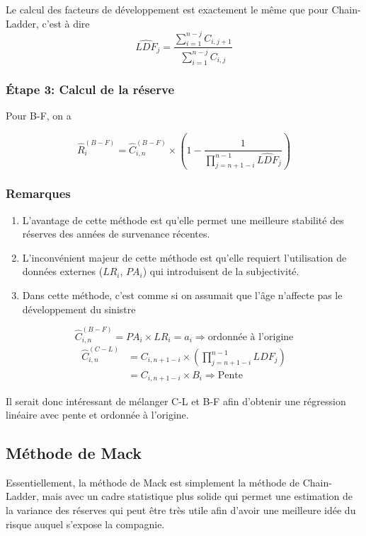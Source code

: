 \documentclass[11pt,french]{report}
\begin{document}
Le calcul des facteurs de développement est exactement le même que pour Chain-Ladder, c'est à dire
$$\widehat{LDF}_j=\frac{\sum_{i=1}^{n-j} C_{i,j+1}}{\sum_{i=1}^{n-j} C_{i,j}}$$

\subsubsection*{ Étape 3: Calcul de la réserve }

Pour B-F, on a 

$$\boxed{\widehat{R}_i^{(B-F)}=\widehat{C}_{i,n}^{(B-F)}\times \left(1 - \frac{1}{\prod_{j=n+1-i}^{n-1} \widehat{LDF}_j} \right)}$$

\subsubsection*{  Remarques }

\begin{enumerate}
\item L'avantage de cette méthode est qu'elle permet une meilleure stabilité des réserves des années de survenance récentes.
\item L'inconvénient majeur de cette méthode est qu'elle requiert l'utilisation de données externes ($LR_i$, $PA_i$) qui introduisent de la subjectivité.
\item Dans cette méthode, c'est comme si on assumait que l'âge n'affecte pas le développement du sinistre
\end{enumerate}

$$\widehat{C}_{i,n}^{(B-F)}=PA_i \times LR_i = a_i \Rightarrow \text{ordonnée à l'origine}$$
$$\begin{aligned}
\widehat{C}_{i,n}^{(C-L)}&=C_{i,n+1-i} \times \left(\prod_{j=n+1-i}^{n-1} LDF_j \right) \\
                    &= C_{i,n+1-i} \times B_i \Rightarrow \text{Pente}
\end{aligned}$$

Il serait donc intéressant de mélanger C-L et B-F afin d'obtenir une régression linéaire avec pente et ordonnée à l'origine.

\subsection*{Méthode de Mack}

Essentiellement, la méthode de Mack est simplement la méthode de Chain-Ladder, mais avec un cadre statistique plus solide qui permet une estimation de la variance des réserves qui peut être très utile afin d'avoir une meilleure idée du risque auquel s'expose la compagnie.
\end{document}
